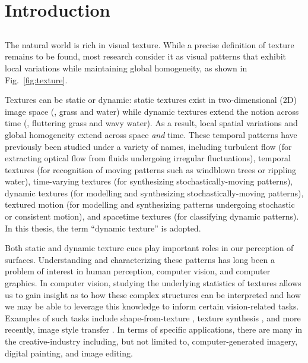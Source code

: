 \chapter{Introduction}

\section{}

The natural world is rich in visual texture. While a precise definition of 
texture remains to be found, most research consider it as visual patterns that 
exhibit local variations while maintaining global homogeneity, as shown in Fig.\ \ref{fig:texture}.



Textures 
can be static or dynamic: static textures exist in two-dimensional (2D) image space 
(\eg, grass and water) while dynamic textures extend the notion across time (\eg, 
fluttering grass and wavy water). As a result, local spatial variations and 
global homogeneity extend across space \emph{and} time. These temporal patterns 
have previously been studied under a variety of names, including turbulent flow \cite{heeger1986} (for extracting optical flow from fluids undergoing irregular fluctuations), temporal textures \cite{nelson1992} (for recognition of moving patterns such as windblown trees or rippling water), time-varying 
textures \cite{bar-joseph2001} (for synthesizing stochastically-moving patterns), dynamic textures \cite{doretto2003} (for modelling and synthesizing stochastically-moving patterns), textured 
motion \cite{wang2003} (for modelling and synthesizing patterns undergoing stochastic or consistent motion), and spacetime textures \cite{derpanis2012spacetime} (for classifying dynamic patterns).
In this thesis, the term ``dynamic texture'' is adopted.

Both static and dynamic texture cues play important roles in our perception of 
surfaces. Understanding and characterizing these patterns has long been a problem 
of interest in human perception, computer vision, and computer graphics. In 
computer vision, studying the underlying statistics of textures allows us to gain 
insight as to how these complex structures can be interpreted and how we may be 
able to leverage this knowledge to inform certain vision-related tasks. Examples 
of such tasks include shape-from-texture \cite{gibson1950perception},  texture 
synthesis \cite{heeger1995pyramid}, and more recently, image style transfer 
\cite{gatys2016image}. In terms of specific applications, 
there are many in the creative-industry including, but not limited to, computer-generated imagery, digital painting, and image editing.

